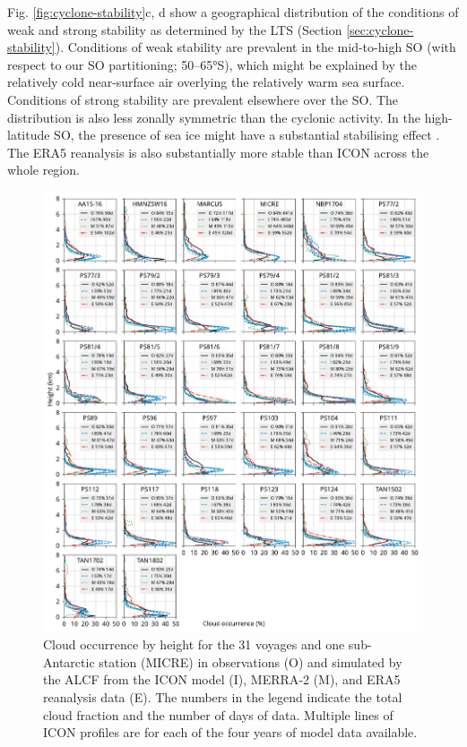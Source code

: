 \documentclass[draft]{agujournal2019}
\begin{document}
Fig. \ref{fig:cyclone-stability}c, d show a geographical distribution of the conditions of weak and strong stability as determined by the LTS (Section \ref{sec:cyclone-stability}). Conditions of weak stability are prevalent in the mid-to-high SO (with respect to our SO partitioning; 50--65°S), which might be explained by the relatively cold near-surface air overlying the relatively warm sea surface. Conditions of strong stability are prevalent elsewhere over the SO. The distribution is also less zonally symmetric than the cyclonic activity. In the high-latitude SO, the presence of sea ice might have a substantial stabilising effect . The ERA5 reanalysis is also substantially more stable than ICON across the whole region.

\begin{figure}[p!]
\centerline{
\includegraphics[width=1.06\textwidth]{img/cloud_occurrence_panel.pdf}
}
\caption{
Cloud occurrence by height for the 31 voyages and one sub-Antarctic station (MICRE) in observations (O) and simulated by the ALCF from the ICON model (I), MERRA‐2 (M), and ERA5 reanalysis data (E). The numbers in the legend indicate the total cloud fraction and the number of days of data. Multiple lines of ICON profiles are for each of the four years of model data available.
}
\label{fig:cloud-occurrence-panel}
\end{figure}
\end{document}
